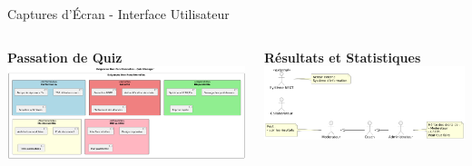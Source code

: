 \documentclass[aspectratio=169]{beamer}
\begin{document}
\begin{frame}{Captures d'Écran - Interface Utilisateur}
    \begin{columns}
        \begin{center}
            \textbf{Passation de Quiz}\\[0.3cm]
            \includegraphics[width=\textwidth]{latex_media/media/image12.png}
        \end{center}

        \begin{center}
            \textbf{Résultats et Statistiques}\\[0.3cm]
            \includegraphics[width=\textwidth]{latex_media/media/image13.png}
        \end{center}
    \end{columns}
\end{frame}
\end{document}
